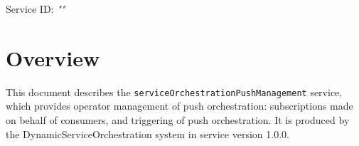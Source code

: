 \documentclass[a4paper]{arrowhead}
\begin{document}
\sloppy

\ArrowheadSetup

\begin{center}
  \vspace*{1cm}
  \huge{\arrowtitle}

  \vspace*{0.2cm}
  \LARGE{\arrowtype}
  \vspace*{1cm}

  \Large{Service ID: \textit{"\arrowid"}}

  \vspace*{\fill}


  \vspace*{1cm}
  \vspace*{\fill}

  \begin{abstract}
    This document describes the \texttt{service\allowbreak{}Orchestration\allowbreak{}Push\allowbreak{}Management} service, version 1.0.0, produced by the DynamicServiceOrchestration core system of Arrowhead 5.2.2.
  \end{abstract}

  \vspace*{1cm}
\end{center}

\newpage

\tableofcontents
\newpage

\section{Overview}
\label{sec:overview}

This document describes the \texttt{service\allowbreak{}Orchestration\allowbreak{}Push\allowbreak{}Management} service, which provides operator management of push orchestration: subscriptions made on behalf of consumers, and triggering of push orchestration.
It is produced by the DynamicServiceOrchestration system \cite{dso-sysd} in service version 1.0.0.
\end{document}
